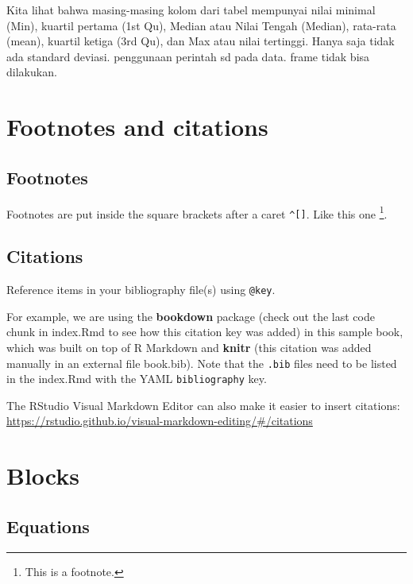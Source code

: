 \documentclass[
]{book}
\theoremstyle{definition}
\theoremstyle{definition}
\theoremstyle{definition}
\theoremstyle{definition}
\theoremstyle{remark}
\begin{document}
Kita lihat bahwa masing-masing kolom dari tabel mempunyai nilai minimal (Min), kuartil pertama (1st Qu), Median atau Nilai Tengah (Median), rata-rata (mean), kuartil ketiga (3rd Qu), dan Max atau nilai tertinggi. Hanya saja tidak ada standard deviasi. penggunaan perintah sd pada data. frame tidak bisa dilakukan.

\hypertarget{footnotes-and-citations}{%
\chapter{Footnotes and citations}\label{footnotes-and-citations}}

\hypertarget{footnotes}{%
\section{Footnotes}\label{footnotes}}

Footnotes are put inside the square brackets after a caret \texttt{\^{}{[}{]}}. Like this one \footnote{This is a footnote.}.

\hypertarget{citations}{%
\section{Citations}\label{citations}}

Reference items in your bibliography file(s) using \texttt{@key}.

For example, we are using the \textbf{bookdown} package \citep{R-bookdown} (check out the last code chunk in index.Rmd to see how this citation key was added) in this sample book, which was built on top of R Markdown and \textbf{knitr} \citep{xie2015} (this citation was added manually in an external file book.bib).
Note that the \texttt{.bib} files need to be listed in the index.Rmd with the YAML \texttt{bibliography} key.

The RStudio Visual Markdown Editor can also make it easier to insert citations: \url{https://rstudio.github.io/visual-markdown-editing/\#/citations}

\hypertarget{blocks}{%
\chapter{Blocks}\label{blocks}}

\hypertarget{equations}{%
\section{Equations}\label{equations}}
\end{document}
